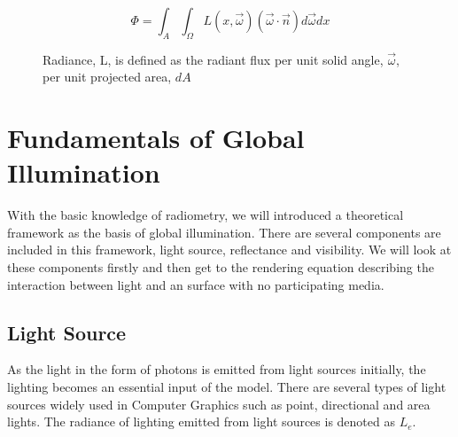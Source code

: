\begin{equation} 
\Phi = \int_{A}\int_{\Omega}L(x, \overrightarrow{\omega})(\overrightarrow{\omega} \cdot \overrightarrow{n})d\overrightarrow{\omega}dx
\label{eq:flux_from_radiance}
\end{equation} 

\begin{figure}[htp] 
    \centering 
    \renewcommand{\thefigure}{\thechapter.\arabic{figure}}
    \caption[Geometric setup of radiance and solid angle]{Radiance, L, is defined as the radiant flux per unit solid angle, \(\overrightarrow{\omega}\), per unit projected area, \(dA\)}
    \label{fig:radiance_solid_angle} 
\end{figure} 


\section{Fundamentals of Global Illumination}
With the basic knowledge of radiometry, we will introduced a theoretical framework as the basis of global illumination. There are several components are included in this framework, light source, reflectance and visibility. We will look at these components firstly and then get to the rendering equation describing the interaction between light and an surface with no participating media. 

\subsection{Light Source} 
As the light in the form of photons is emitted from light sources initially, the lighting becomes an essential input of the model. There are several types of light sources widely used in Computer Graphics such as point, directional and area lights. The radiance of lighting emitted from light sources is denoted as \( L_{e} \). 

